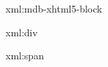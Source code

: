 
\startxmlsetups xml:mdb-xhtml5-block
\stopxmlsetups


\startxmlsetups xml:div
\stopxmlsetups

\startxmlsetups xml:span
\stopxmlsetups

